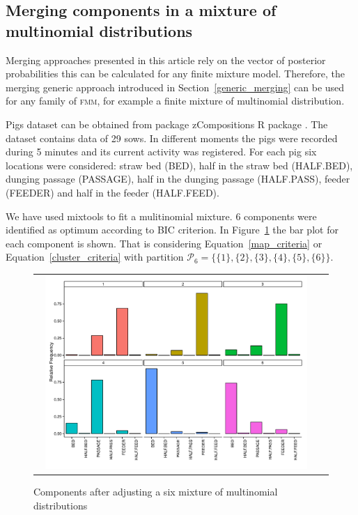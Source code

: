 \documentclass[submit]{smj}
\theoremstyle{definition}
\newcommand{\fmm}{\textsc{fmm}\xspace}
\newcommand{\pkg}[1]{{\fontseries{b}\selectfont #1}}
\begin{document}
\subsection{Merging components in a mixture of multinomial distributions}\label{multinom_example}

Merging approaches presented in this article rely on the vector of posterior probabilities this can be calculated for any finite mixture model. Therefore, the merging generic approach introduced in Section~\ref{generic_merging} can be used for any family of \fmm, for example a finite mixture of multinomial distribution.

Pigs dataset can be obtained from package \pkg{zCompositions} R package \citep{palarea2012zcompositions}. The dataset contains data of 29 sows. In different moments the pigs were recorded during 5 minutes and its current activity was registered. For each pig six locations were considered: straw bed (BED), half in the straw bed (HALF.BED), dunging passage (PASSAGE), half in the dunging passage (HALF.PASS), feeder (FEEDER) and half in the feeder (HALF.FEED).

We have used \pkg{mixtools} \citep{benaglia2009mixtools} to fit a mulitinomial mixture. 6 components were identified as optimum according to BIC criterion. In Figure~\ref{multinomial_mixture} the bar plot for each component is shown. That is considering Equation~\ref{map_criteria} or Equation~\ref{cluster_criteria} with partition $\mathcal{P}_6 = \{\{1\}, \{2\}, \{3\}, \{4\}, \{5\}, \{6\}\}$.

\begin{figure}[t]
\begin{center}
\begin{tabular}{cc}
  \includegraphics[width=0.95\textwidth]{figures/multinomial_mixt_all.pdf} \\
 \end{tabular}
 \caption{Components after adjusting a six mixture of multinomial distributions}\label{multinomial_mixture}
\end{center}
\end{figure}
\end{document}
